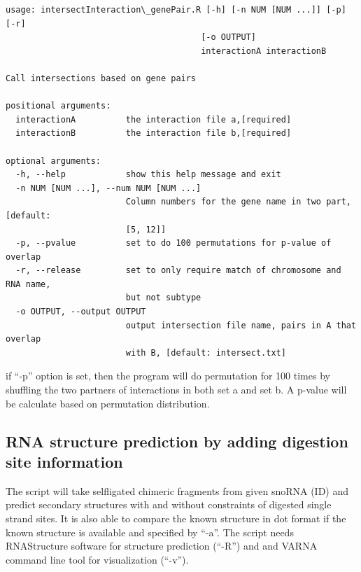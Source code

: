 \documentclass[letterpaper,10pt,english]{sphinxmanual}
\begin{document}
\begin{Verbatim}[commandchars=\\\{\}]
usage: intersectInteraction\_genePair.R [-h] [-n NUM [NUM ...]] [-p] [-r]
                                       [-o OUTPUT]
                                       interactionA interactionB

Call intersections based on gene pairs

positional arguments:
  interactionA          the interaction file a,[required]
  interactionB          the interaction file b,[required]

optional arguments:
  -h, --help            show this help message and exit
  -n NUM [NUM ...], --num NUM [NUM ...]
                        Column numbers for the gene name in two part,[default:
                        [5, 12]]
  -p, --pvalue          set to do 100 permutations for p-value of overlap
  -r, --release         set to only require match of chromosome and RNA name,
                        but not subtype
  -o OUTPUT, --output OUTPUT
                        output intersection file name, pairs in A that overlap
                        with B, [default: intersect.txt]
\end{Verbatim}

if ``-p'' option is set, then the program will do permutation for 100 times by shuffling the two partners of interactions in both set a and set b. A p-value will be calculate based on permutation distribution.


\subsection{RNA structure prediction by adding digestion site information}
\label{Analysis_pipeline:rna-structure-prediction-by-adding-digestion-site-information}\label{Analysis_pipeline:structure}
The script will take selfligated chimeric fragments from given snoRNA (ID) and predict secondary structures with and without constraints of digested single strand sites. It is also able to compare the known structure in dot format if the known structure is available and specified by ``-a''. The script needs RNAStructure software for structure prediction (``-R'') and  and VARNA command line tool for visualization (``-v'').
\end{document}
